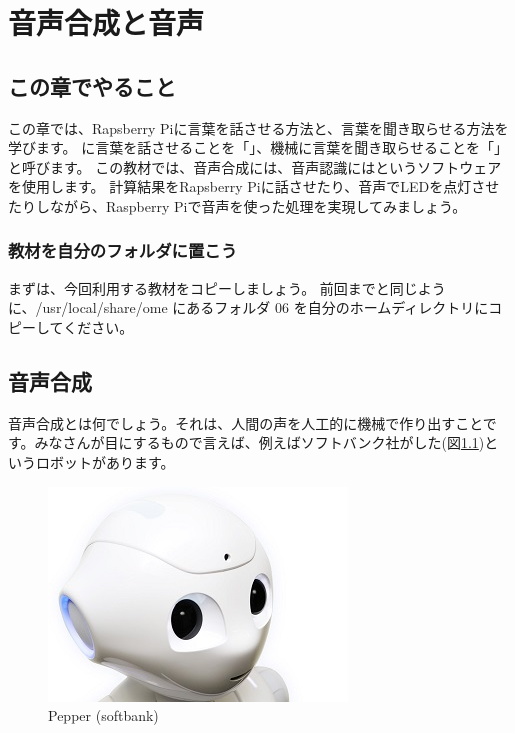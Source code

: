 \chapter{音声合成と音声}
\section{この章でやること}

この章では、Rapsberry Piに言葉を話させる方法と、言葉を聞き取らせる方法を学びます。
に言葉を話させることを「」、機械に言葉を聞き取らせることを「」と呼びます。
この教材では、音声合成には、音声認識にはというソフトウェアを使用します。
計算結果をRapsberry Piに話させたり、音声でLEDを点灯させたりしながら、Raspberry Piで音声を使った処理を実現してみましょう。

\subsection{教材を自分のフォルダに置こう}
まずは、今回利用する教材をコピーしましょう。
前回までと同じように、\nobreak/usr/local/share/ome にあるフォルダ 06 を自分のホームディレクトリにコピーしてください。

\newpage
\section{音声合成}
音声合成とは何でしょう。それは、人間の声を人工的に機械で作り出すことです。みなさんが目にするもので言えば、例えばソフトバンク社がした(図\ref{pepper})というロボットがあります。

\begin{figure}[H]
\begin{center}
    \includegraphics[width=.4\linewidth]{images/chap06/text06-img001.jpg}
    \caption{Pepper (softbank)}
    \label{pepper}
\end{center}
\end{figure}

